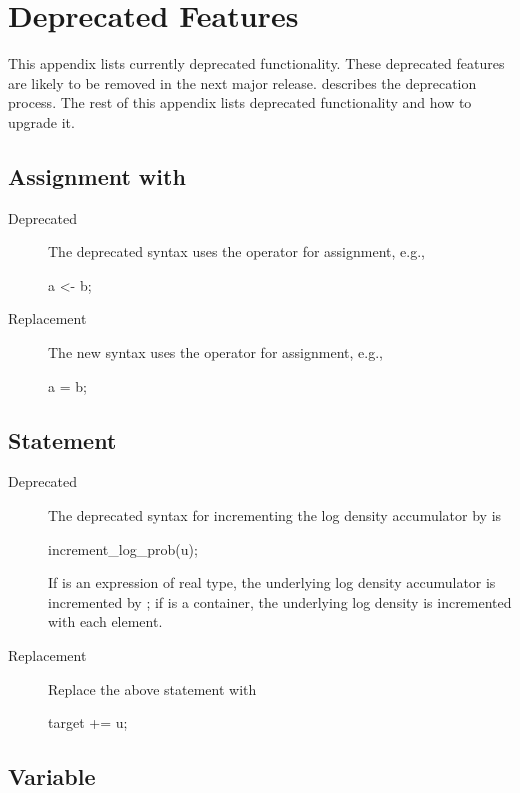 \chapter{Deprecated Features}\label{deprecated-features.appendix}

\noindent
This appendix lists currently deprecated functionality.  These
deprecated features are likely to be removed in the next major
release.   describes the deprecation
process.  The rest of this appendix lists deprecated functionality and
how to upgrade it.

\section{Assignment with \code{<-}}

\begin{description}
\item[Deprecated] The deprecated syntax uses the operator \code{<-}
  for assignment, e.g.,
\begin{stancode}
a <- b;
\end{stancode}
\item[Replacement] The new syntax uses the operator \code{=} for
  assignment, e.g.,
\begin{stancode}
a = b;
\end{stancode}
\end{description}

\section{ Statement}

\begin{description}
\item[Deprecated] The deprecated syntax for incrementing the log
  density accumulator by  is
\begin{stancode}
increment_log_prob(u);
\end{stancode}
If  is an expression of real type, the underlying log density
accumulator is incremented by ;  if  is a container,
the underlying log density is incremented with each element.
\item[Replacement] Replace the above statement with
\begin{stancode}
target += u;
\end{stancode}
\end{description}

\section{ Variable}

